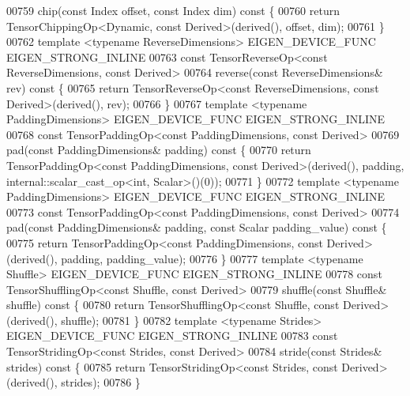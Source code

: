 \begin{DoxyCode}
00759     chip(\textcolor{keyword}{const} Index offset, \textcolor{keyword}{const} Index dim)\textcolor{keyword}{ const }\{
00760       \textcolor{keywordflow}{return} TensorChippingOp<Dynamic, const Derived>(derived(), offset, dim);
00761     \}
00762     \textcolor{keyword}{template} <\textcolor{keyword}{typename} ReverseDimensions> EIGEN\_DEVICE\_FUNC EIGEN\_STRONG\_INLINE
00763     \textcolor{keyword}{const} TensorReverseOp<const ReverseDimensions, const Derived>
00764     reverse(\textcolor{keyword}{const} ReverseDimensions& rev)\textcolor{keyword}{ const }\{
00765       \textcolor{keywordflow}{return} TensorReverseOp<const ReverseDimensions, const Derived>(derived(), rev);
00766     \}
00767     \textcolor{keyword}{template} <\textcolor{keyword}{typename} PaddingDimensions> EIGEN\_DEVICE\_FUNC EIGEN\_STRONG\_INLINE
00768     \textcolor{keyword}{const} TensorPaddingOp<const PaddingDimensions, const Derived>
00769     pad(\textcolor{keyword}{const} PaddingDimensions& padding)\textcolor{keyword}{ const }\{
00770       \textcolor{keywordflow}{return} TensorPaddingOp<const PaddingDimensions, const Derived>(derived(), padding, 
      internal::scalar\_cast\_op<int, Scalar>()(0));
00771     \}
00772     \textcolor{keyword}{template} <\textcolor{keyword}{typename} PaddingDimensions> EIGEN\_DEVICE\_FUNC EIGEN\_STRONG\_INLINE
00773     \textcolor{keyword}{const} TensorPaddingOp<const PaddingDimensions, const Derived>
00774     pad(\textcolor{keyword}{const} PaddingDimensions& padding, \textcolor{keyword}{const} Scalar padding\_value)\textcolor{keyword}{ const }\{
00775       \textcolor{keywordflow}{return} TensorPaddingOp<const PaddingDimensions, const Derived>(derived(), padding, padding\_value);
00776     \}
00777     \textcolor{keyword}{template} <\textcolor{keyword}{typename} Shuffle> EIGEN\_DEVICE\_FUNC EIGEN\_STRONG\_INLINE
00778     \textcolor{keyword}{const} TensorShufflingOp<const Shuffle, const Derived>
00779     shuffle(\textcolor{keyword}{const} Shuffle& shuffle)\textcolor{keyword}{ const }\{
00780       \textcolor{keywordflow}{return} TensorShufflingOp<const Shuffle, const Derived>(derived(), shuffle);
00781     \}
00782     \textcolor{keyword}{template} <\textcolor{keyword}{typename} Str\textcolor{keywordtype}{id}es> EIGEN\_DEVICE\_FUNC EIGEN\_STRONG\_INLINE
00783     \textcolor{keyword}{const} TensorStridingOp<const Strides, const Derived>
00784     stride(\textcolor{keyword}{const} Strides& strides)\textcolor{keyword}{ const }\{
00785       \textcolor{keywordflow}{return} TensorStridingOp<const Strides, const Derived>(derived(), strides);
00786     \}

\end{DoxyCode}
